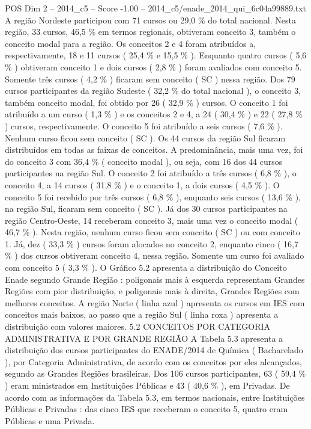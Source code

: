 \begin{textsample}{POS Dim 2 – 2014\_c5 – Score -1.00 – 2014\_c5/enade\_2014\_qui\_6c04a99889.txt}
A região Nordeste participou com 71 cursos ou 29,0 \% do total nacional.
Nesta região, 33 cursos, 46,5 \% em termos regionais, obtiveram conceito 3, também o conceito modal para a região.
Os conceitos 2 e 4 foram atribuídos a, respectivamente, 18 e 11 cursos ( 25,4 \% e 15,5 \% ).
Enquanto quatro cursos ( 5,6 \% ) obtiveram conceito 1 e dois cursos ( 2,8 \% ) foram avaliados com conceito 5.
Somente três cursos ( 4,2 \% ) ficaram sem conceito ( SC ) nessa região.
Dos 79 cursos participantes da região Sudeste ( 32,2 \% do total nacional ), o conceito 3, também conceito modal, foi obtido por 26 ( 32,9 \% ) cursos.
O conceito 1 foi atribuído a um curso ( 1,3 \% ) e os conceitos 2 e 4, a 24 ( 30,4 \% ) e 22 ( 27,8 \% ) cursos, respectivamente.
O conceito 5 foi atribuído a seis cursos ( 7,6 \% ).
Nenhum curso ficou sem conceito ( SC ).
Os 44 cursos da região Sul ficaram distribuídos em todas as faixas de conceitos.
A predominância, mais uma vez, foi do conceito 3 com 36,4 \% ( conceito modal ), ou seja, com 16 dos 44 cursos participantes na região Sul.
O conceito 2 foi atribuído a três cursos ( 6,8 \% ), o conceito 4, a 14 cursos ( 31,8 \% ) e o conceito 1, a dois cursos ( 4,5 \% ).
O conceito 5 foi recebido por três cursos ( 6,8 \% ), enquanto seis cursos ( 13,6 \% ), na região Sul, ficaram sem conceito ( SC ).
Já dos 30 cursos participantes na região Centro-Oeste, 14 receberam conceito 3, mais uma vez o conceito modal ( 46,7 \% ).
Nesta região, nenhum curso ficou sem conceito ( SC ) ou com conceito 1.
Já, dez ( 33,3 \% ) cursos foram alocados no conceito 2, enquanto cinco ( 16,7 \% ) dos cursos obtiveram conceito 4, nessa região.
Somente um curso foi avaliado com conceito 5 ( 3,3 \% ).
O Gráfico 5.2 apresenta a distribuição do Conceito Enade segundo Grande Região : poligonais mais à esquerda representam Grandes Regiões com pior distribuição, e poligonais mais à direita, Grandes Regiões com melhores conceitos.
A região Norte ( linha azul ) apresenta os cursos em IES com conceitos mais baixos, ao passo que a região Sul ( linha roxa ) apresenta a distribuição com valores maiores. 5.2 CONCEITOS POR CATEGORIA ADMINISTRATIVA E POR GRANDE REGIÃO A Tabela 5.3 apresenta a distribuição dos cursos participantes do ENADE/2014 de Química ( Bacharelado ), por Categoria Administrativa, de acordo com os conceitos por eles alcançados, segundo as Grandes Regiões brasileiras.
Dos 106 cursos participantes, 63 ( 59,4 \% ) eram ministrados em Instituições Públicas e 43 ( 40,6 \% ), em Privadas.
De acordo com as informações da Tabela 5.3, em termos nacionais, entre Instituições Públicas e Privadas : das cinco IES que receberam o conceito 5, quatro eram Públicas e uma Privada.

\end{textsample}

